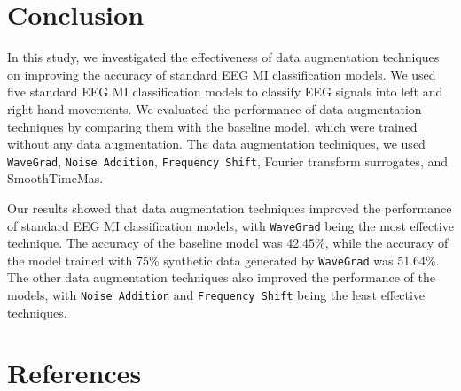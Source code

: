 \documentclass[runningheads]{llncs}
\begin{document}
\section{Conclusion}
In this study, we investigated the effectiveness of data augmentation techniques on improving the accuracy of standard EEG MI classification models. We used five standard EEG MI classification models to classify EEG signals into left and right hand movements. We evaluated the performance of data augmentation techniques by comparing them with the baseline model, which were trained without any data augmentation. The data augmentation techniques, we used \texttt{WaveGrad}, \texttt{Noise Addition}, \texttt{Frequency Shift}, Fourier transform surrogates, and SmoothTimeMas.

Our results showed that data augmentation techniques improved the performance of standard EEG MI classification models, with \texttt{WaveGrad} being the most effective technique. The accuracy of the baseline model was 42.45\%, while the accuracy of the model trained with 75\% synthetic data generated by \texttt{WaveGrad} was 51.64\%. The other data augmentation techniques also improved the performance of the models, with \texttt{Noise Addition} and \texttt{Frequency Shift} being the least effective techniques.


\section{References}

% 
% 


\end{document}
